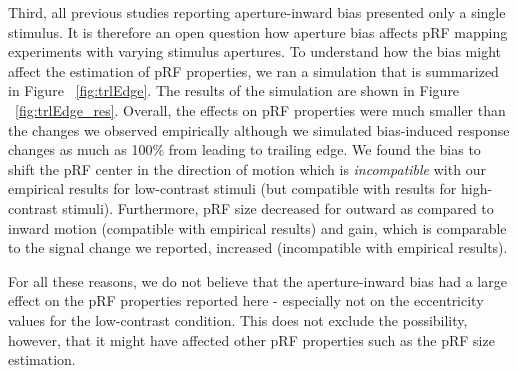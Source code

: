 Third, all previous studies reporting aperture-inward bias presented only a single stimulus. It is therefore an open question how aperture bias affects pRF mapping experiments with varying stimulus apertures. To understand how the bias might affect the estimation of pRF properties, we ran a simulation that is summarized in Figure ~\ref{fig:trlEdge}. The results of the simulation are shown in Figure ~\ref{fig:trlEdge_res}. Overall, the effects on pRF properties were much smaller than the changes we observed empirically although we simulated bias-induced response changes as much as 100\% from leading to trailing edge. We found the bias to shift the pRF center in the direction of motion which is \textit{incompatible} with our empirical results for low-contrast stimuli (but compatible with results for high-contrast stimuli). Furthermore, pRF size decreased for outward as compared to inward motion (compatible with empirical results) and gain, which is comparable to the signal change we reported, increased (incompatible with empirical results).

For all these reasons, we do not believe that the aperture-inward bias had a large effect on the pRF properties reported here - especially not on the eccentricity values for the low-contrast condition. This does not exclude the possibility, however, that it might have affected other pRF properties such as the pRF size estimation.

